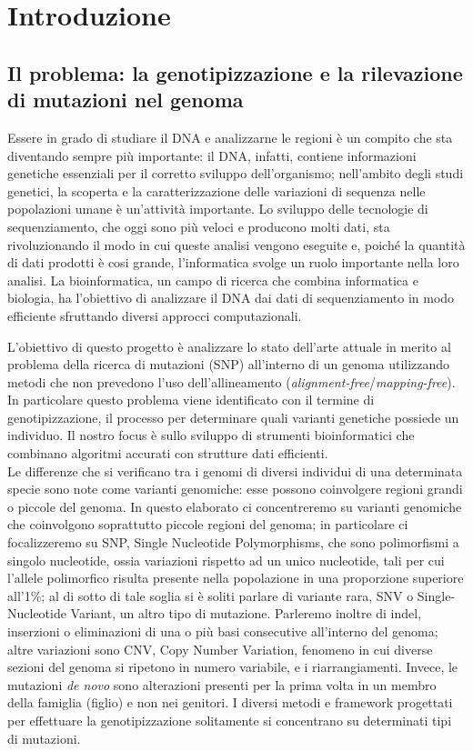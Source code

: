 \documentclass[../main.tex]{subfiles}
\begin{document}
\section{Introduzione} 

\subsection{Il problema: la genotipizzazione e la rilevazione di mutazioni nel genoma}

Essere in grado di studiare il DNA e analizzarne le regioni è un compito che sta diventando sempre più importante: il DNA, infatti, contiene informazioni genetiche essenziali per il corretto sviluppo dell'organismo; nell'ambito degli studi genetici, la scoperta e la caratterizzazione delle variazioni di sequenza nelle popolazioni umane è un'attività importante. Lo sviluppo delle tecnologie di sequenziamento, che oggi sono più veloci e producono molti dati, sta rivoluzionando il modo in cui queste analisi vengono eseguite e, poiché la quantità di dati prodotti è cosi grande, l'informatica svolge un ruolo importante nella loro analisi. La bioinformatica, un campo di ricerca che combina informatica e biologia, ha l'obiettivo di analizzare il DNA dai dati di sequenziamento in modo efficiente sfruttando diversi approcci computazionali. 

L'obiettivo di questo progetto è analizzare lo stato dell'arte attuale in merito al problema della ricerca di mutazioni (SNP) all'interno di un genoma utilizzando metodi che non prevedono l'uso dell'allineamento (\textit{alignment-free}/\textit{mapping-free}). In particolare questo problema viene identificato con il termine di genotipizzazione, il processo per determinare quali varianti genetiche possiede un individuo. Il nostro focus è sullo sviluppo di strumenti bioinformatici che combinano algoritmi accurati con strutture dati efficienti. \\

\noindent
Le differenze che si verificano tra i genomi di diversi individui di una determinata specie sono note come varianti genomiche: esse possono coinvolgere regioni grandi o piccole del genoma. 
In questo elaborato ci concentreremo su varianti genomiche che coinvolgono soprattutto piccole regioni del genoma; in particolare ci focalizzeremo su SNP, Single Nucleotide Polymorphisms, che sono polimorfismi a singolo nucleotide, ossia variazioni rispetto ad un unico nucleotide, tali per cui l'allele polimorfico risulta presente nella popolazione in una proporzione superiore all'1\%; al di sotto di tale soglia si è soliti parlare di variante rara, SNV o Single-Nucleotide Variant, un altro tipo di mutazione. Parleremo inoltre di indel, inserzioni o eliminazioni di una o più basi consecutive all'interno del genoma; altre variazioni sono CNV, Copy Number Variation, fenomeno in cui diverse sezioni del genoma si ripetono in numero variabile, e i riarrangiamenti. Invece, le mutazioni \textit{de novo} sono alterazioni presenti per la prima volta in un membro della famiglia (figlio) e non nei genitori. I diversi metodi e framework progettati per effettuare la genotipizzazione solitamente si concentrano su determinati tipi di mutazioni.
\end{document}
